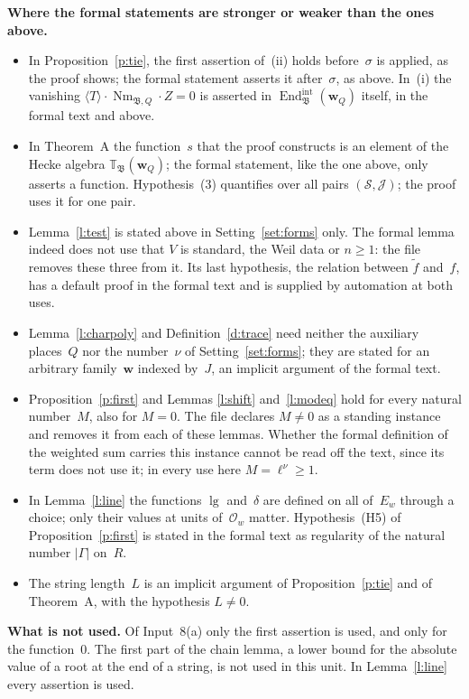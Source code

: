 \documentclass[11pt,a4paper]{article}
\newcommand{\m}[1]{\mbox{$#1$}}        %
\newcommand{\subhead}[1]{\par\addvspace{9pt plus 2pt}\Needspace{4\baselineskip}\noindent\textbf{#1}\enspace\ignorespaces}
\theoremstyle{plainx}
\theoremstyle{uprightx}
\newcommand{\Ew}[1]{E_{#1}}
\newcommand{\Ow}[1]{\mathcal{O}_{#1}}
\newcommand{\lgf}{\operatorname{lg}}
\newcommand{\Eint}{\operatorname{End}^{\mathrm{int}}}
\newcommand{\Nm}{\operatorname{Nm}}
\newcommand{\Hk}{\mathbb{T}}
\newcommand{\dg}[1]{\langle #1\rangle}
\newcommand{\fB}{\mathfrak{B}}
\newcommand{\bw}{\mathbf{w}}
\newcommand{\cS}{\mathcal{S}}
\newcommand{\cJ}{\mathcal{J}}
\newcommand{\TQ}{\Hk_{\fB}(\bw_Q)}
\newcommand{\EQ}{\Eint_{\fB}(\bw_Q)}
\newcommand{\NQ}{\Nm_{\fB,Q}}
\begin{document}
\subhead{Where the formal statements are stronger or weaker than the ones above.}
\begin{itemize}[leftmargin=1.4em,itemsep=2pt]
\item In Proposition~\ref{p:tie}, the first assertion of~(ii) holds before~$\sigma$ is applied, as the proof shows;
the formal statement asserts it after~$\sigma$, as above. In~(i) the vanishing \m{\dg{T}\cdot\NQ\cdot Z=0} is asserted in
\m{\EQ} itself, in the formal text and above.
\item In Theorem~A the function~$s$ that the proof constructs is an element of the Hecke algebra \m{\TQ}; the
formal statement, like the one above, only asserts a function. Hypothesis~(3) quantifies over all pairs
\m{(\cS,\cJ)}; the proof uses it for one pair.
\item Lemma~\ref{l:test} is stated above in Setting~\ref{set:forms} only. The formal lemma indeed does not use
that $V$ is standard, the Weil data or \m{n\ge1}: the file removes these three from it. Its last hypothesis, the
relation between $\tilde f$ and~$f$, has a default proof in the formal text and is supplied by automation at both
uses.
\item Lemma~\ref{l:charpoly} and Definition~\ref{d:trace} need neither the auxiliary places~$Q$ nor the number~$\nu$
of Setting~\ref{set:forms}; they are stated for an arbitrary family~$\bw$ indexed by~$J$, an implicit argument of
the formal text.
\item Proposition~\ref{p:first} and Lemmas \ref{l:shift} and~\ref{l:modeq} hold for every natural number~$M$,
also for \m{M=0}. The file declares \m{M\ne0} as a standing instance and removes it from each of these lemmas.
Whether the formal definition of the weighted sum carries this instance cannot be read off the text, since its
term does not use it; in every use here \m{M=\ell^\nu\ge1}.
\item In Lemma~\ref{l:line} the functions $\lgf$ and~$\delta$ are defined on all of~$\Ew{w}$ through a choice;
only their values at units of~$\Ow{w}$ matter. Hypothesis~(H5) of Proposition~\ref{p:first} is stated in the formal
text as regularity of the natural number \m{|\Gamma|} on~$R$.
\item The string length~$L$ is an implicit argument of Proposition~\ref{p:tie} and of Theorem~A, with the
hypothesis \m{L\ne0}.
\end{itemize}

\subhead{What is not used.} Of Input~8(a) only the first assertion is used, and only for the function~$0$. The
first part of the chain lemma, a lower bound for the absolute value of a root at the end of a string, is not used
in this unit. In Lemma~\ref{l:line} every assertion is used.
\end{document}
